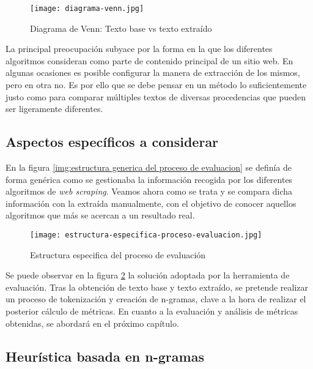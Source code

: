 \begin{figure}[tphb]
  \centering
  \texttt{[image: diagrama-venn.jpg]}
  \caption{Diagrama de Venn: Texto base vs texto extraído}
  \label{img:diagrama venn: texto base vs texto extraido}
\end{figure}

La principal preocupación subyace por la forma en la que los diferentes algoritmos consideran como parte
de contenido principal de un sitio web. En algunas ocasiones es posible configurar la manera de extracción
de los mismos, pero en otra no. Es por ello que se debe pensar en un método lo suficientemente justo como
para comparar múltiples textos de diversas procedencias que pueden ser ligeramente diferentes.

\subsection{Aspectos específicos a considerar}
\label{subsec:aspectos especificos a considerar}

En la figura \ref{img:estructura generica del proceso de evaluacion} se definía de forma genérica como se
gestionaba la información recogida por los diferentes algoritmos de \emph{web scraping}. Veamos ahora como
se trata y se compara dicha información con la extraída manualmente, con el objetivo de conocer aquellos
algoritmos que más se acercan a un resultado real.

\begin{figure}[tphb]
  \centering
  \texttt{[image: estructura-especifica-proceso-evaluacion.jpg]}
  \caption{Estructura especifica del proceso de evaluación}
  \label{img:estructura específica del proceso de evaluacion}
\end{figure}

Se puede observar en la figura \ref{img:estructura específica del proceso de evaluacion} la solución
adoptada por la herramienta de evaluación. Tras la obtención de texto base y texto extraído, se pretende
realizar un proceso de tokenización y creación de n-gramas, clave a la hora de realizar el posterior cálculo
de métricas. En cuanto a la evaluación y análisis de métricas obtenidas, se abordará en el próximo capítulo.

\subsection{Heurística basada en n-gramas}
\label{subsec:heuristica basada en n-gramas}

